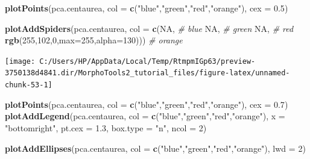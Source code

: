 \documentclass[
]{article}
\newenvironment{Shaded}{\begin{snugshade}}{\end{snugshade}}
\newcommand{\CommentTok}[1]{\textcolor[rgb]{0.56,0.35,0.01}{\textit{#1}}}
\newcommand{\DataTypeTok}[1]{\textcolor[rgb]{0.13,0.29,0.53}{#1}}
\newcommand{\DecValTok}[1]{\textcolor[rgb]{0.00,0.00,0.81}{#1}}
\newcommand{\FloatTok}[1]{\textcolor[rgb]{0.00,0.00,0.81}{#1}}
\newcommand{\KeywordTok}[1]{\textcolor[rgb]{0.13,0.29,0.53}{\textbf{#1}}}
\newcommand{\NormalTok}[1]{#1}
\newcommand{\OtherTok}[1]{\textcolor[rgb]{0.56,0.35,0.01}{#1}}
\newcommand{\StringTok}[1]{\textcolor[rgb]{0.31,0.60,0.02}{#1}}
\begin{document}
\begin{Shaded}
\begin{Highlighting}[]
\KeywordTok{plotPoints}\NormalTok{(pca.centaurea, }\DataTypeTok{col =} \KeywordTok{c}\NormalTok{(}\StringTok{"blue"}\NormalTok{,}\StringTok{"green"}\NormalTok{,}\StringTok{"red"}\NormalTok{,}\StringTok{"orange"}\NormalTok{), }\DataTypeTok{cex =} \FloatTok{0.5}\NormalTok{)}

\KeywordTok{plotAddSpiders}\NormalTok{(pca.centaurea, }\DataTypeTok{col =} \KeywordTok{c}\NormalTok{(}\OtherTok{NA}\NormalTok{, }\CommentTok{# blue}
                                      \OtherTok{NA}\NormalTok{, }\CommentTok{# green}
                                      \OtherTok{NA}\NormalTok{, }\CommentTok{# red}
                                      \KeywordTok{rgb}\NormalTok{(}\DecValTok{255}\NormalTok{,}\DecValTok{102}\NormalTok{,}\DecValTok{0}\NormalTok{,}\DataTypeTok{max=}\DecValTok{255}\NormalTok{,}\DataTypeTok{alpha=}\DecValTok{130}\NormalTok{))) }\CommentTok{# orange}
\end{Highlighting}
\end{Shaded}

\begin{center}\texttt{[image: C:/Users/HP/AppData/Local/Temp/RtmpmIGp63/preview-3750138d4841.dir/MorphoTools2\_tutorial\_files/figure-latex/unnamed-chunk-53-1]} \end{center}

\begin{Shaded}
\begin{Highlighting}[]
\KeywordTok{plotPoints}\NormalTok{(pca.centaurea, }\DataTypeTok{col =} \KeywordTok{c}\NormalTok{(}\StringTok{"blue"}\NormalTok{,}\StringTok{"green"}\NormalTok{,}\StringTok{"red"}\NormalTok{,}\StringTok{"orange"}\NormalTok{), }\DataTypeTok{cex =} \FloatTok{0.7}\NormalTok{)}
\KeywordTok{plotAddLegend}\NormalTok{(pca.centaurea, }\DataTypeTok{col =} \KeywordTok{c}\NormalTok{(}\StringTok{"blue"}\NormalTok{,}\StringTok{"green"}\NormalTok{,}\StringTok{"red"}\NormalTok{,}\StringTok{"orange"}\NormalTok{), }
               \DataTypeTok{x =} \StringTok{"bottomright"}\NormalTok{, }\DataTypeTok{pt.cex =} \FloatTok{1.3}\NormalTok{, }\DataTypeTok{box.type =} \StringTok{"n"}\NormalTok{, }\DataTypeTok{ncol =} \DecValTok{2}\NormalTok{)}

\KeywordTok{plotAddEllipses}\NormalTok{(pca.centaurea, }\DataTypeTok{col =} \KeywordTok{c}\NormalTok{(}\StringTok{"blue"}\NormalTok{,}\StringTok{"green"}\NormalTok{,}\StringTok{"red"}\NormalTok{,}\StringTok{"orange"}\NormalTok{), }\DataTypeTok{lwd =} \DecValTok{2}\NormalTok{)}
\end{Highlighting}
\end{Shaded}
\end{document}
